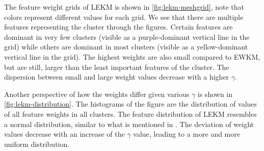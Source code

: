 \documentclass[../report.tex]{subfiles}
\begin{document}
The feature weight grids of LEKM is shown in \cref{fig:lekm-meshgrid}, note that colors represent different values for each grid. We see that there are multiple features representing the cluster through the figures. Certain features are dominant in very few clusters (visible as a purple-dominant vertical line in the grid) while others are dominant in most clusters (visible as a yellow-dominant vertical line in the grid). The highest weights are also small compared to EWKM, but are still, larger than the least important features of the cluster. The dispersion between small and large weight values decrease with a higher $\gamma$.

Another perspective of how the weights differ given various $\gamma$ is shown in \cref{fig:lekm-distribution}. The histograms of the figure are the distribution of values of all feature weights in all clusters. The feature distribution of LEKM resembles a normal distribution, similar to what is mentioned in \cite{Jing2007}. The deviation of weight values decrease with an increase of the $\gamma$ value, leading to a more and more uniform distribution.

\begin{frame}

\begin{figure}
\end{figure}

\end{frame}
\end{document}
